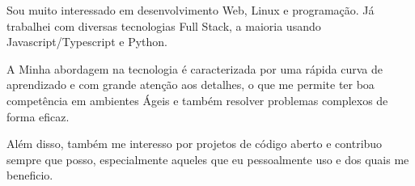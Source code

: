 

\begin{cvparagraph}

Sou muito interessado em desenvolvimento Web, Linux e programação. Já trabalhei com diversas tecnologias Full Stack, a maioria usando Javascript/Typescript e Python.

\end{cvparagraph}

\begin{cvparagraph}
A Minha abordagem na tecnologia é caracterizada por uma rápida curva de aprendizado e com grande atenção aos detalhes, o que me permite ter boa competência em ambientes Ágeis e também resolver problemas complexos de forma eficaz. 
\end{cvparagraph}

\begin{cvparagraph}

Além disso, também me interesso por projetos de código aberto e contribuo sempre que posso, especialmente aqueles que eu pessoalmente uso e dos quais me beneficio.

\end{cvparagraph}